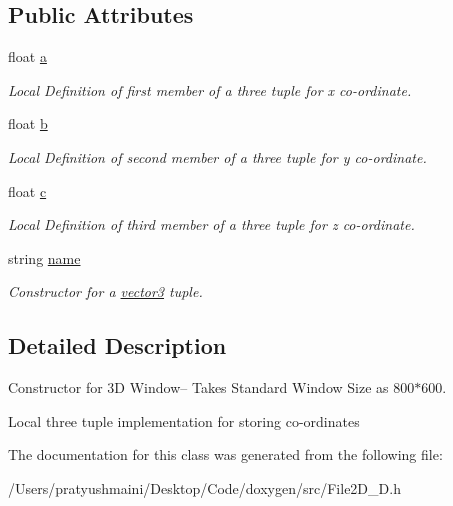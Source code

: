 \subsection*{Public Attributes}
\begin{DoxyCompactItemize}
\item 
\mbox{\label{classvector3_ad05fb5a03bd49d90ec3e3d8f586c18c9}} 
float \mbox{\hyperlink{classvector3_ad05fb5a03bd49d90ec3e3d8f586c18c9}{a}}
\begin{DoxyCompactList}\small\item\em Local Definition of first member of a three tuple for x co-\/ordinate. \end{DoxyCompactList}\item 
\mbox{\label{classvector3_a49585323bf991bed1c3853b2158dc715}} 
float \mbox{\hyperlink{classvector3_a49585323bf991bed1c3853b2158dc715}{b}}
\begin{DoxyCompactList}\small\item\em Local Definition of second member of a three tuple for y co-\/ordinate. \end{DoxyCompactList}\item 
\mbox{\label{classvector3_abad4c3720c2f3a5245c57a6d08930882}} 
float \mbox{\hyperlink{classvector3_abad4c3720c2f3a5245c57a6d08930882}{c}}
\begin{DoxyCompactList}\small\item\em Local Definition of third member of a three tuple for z co-\/ordinate. \end{DoxyCompactList}\item 
\mbox{\label{classvector3_a5dbee38c09ab32dc203e61d26b37c122}} 
string \mbox{\hyperlink{classvector3_a5dbee38c09ab32dc203e61d26b37c122}{name}}
\begin{DoxyCompactList}\small\item\em Constructor for a \mbox{\hyperlink{classvector3}{vector3}} tuple. \end{DoxyCompactList}\end{DoxyCompactItemize}


\subsection{Detailed Description}
Constructor for 3D Window-- Takes Standard Window Size as 800$\ast$600. 

Local three tuple implementation for storing co-\/ordinates 

The documentation for this class was generated from the following file\+:\begin{DoxyCompactItemize}
\item 
/\+Users/pratyushmaini/\+Desktop/\+Code/doxygen/src/File2\+D\+\_\+D.\+h\end{DoxyCompactItemize}
